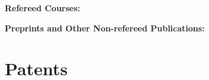 \begin{refsection}
  \textbf{Refereed Courses:}
  \nocite{jorge2023approaches}
  \printbibliography[heading=none]
\end{refsection}

\begin{refsection}
  \textbf{Preprints and Other Non-refereed Publications:}
  \nocite{Kopper:2009ij,Judge:2008vn,Kopper:2008dp}
  \printbibliography[heading=none]
\end{refsection}

\section{Patents}
\begin{refsection}
  \nocite{Kopper:2019af, Kopper:2020aa}
  \printbibliography[heading=none]
\end{refsection}
